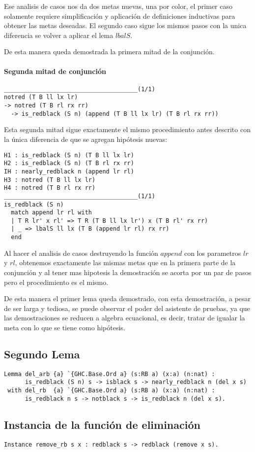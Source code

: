 Ese analisis de casos nos da dos metas nuevas, una por color, el primer caso solamente requiere
simplificaci\'on y aplicaci\'on de definiciones inductivas para obtener las metas deseadas. El
segundo caso sigue los mismos pasos con la unica diferencia se volver a aplicar el lema $lbalS$.

De esta manera queda demostrada la primera mitad de la conjunci\'on.

\paragraph{Segunda mitad de conjunci\'on}

\begin{verbatim}
______________________________________(1/1)
notred (T B ll lx lr)
-> notred (T B rl rx rr)
  -> is_redblack (S n) (append (T B ll lx lr) (T B rl rx rr))
\end{verbatim}

Esta segunda mitad sigue exactamente el mismo procedimiento antes descrito con la \'unica
diferencia de que se agregan hip\'otesis nuevas:

\begin{verbatim}
H1 : is_redblack (S n) (T B ll lx lr)
H2 : is_redblack (S n) (T B rl rx rr)
IH : nearly_redblack n (append lr rl)
H3 : notred (T B ll lx lr)
H4 : notred (T B rl rx rr)
______________________________________(1/1)
is_redblack (S n)
  match append lr rl with
  | T R lr' x rl' => T R (T B ll lx lr') x (T B rl' rx rr)
  | _ => lbalS ll lx (T B (append lr rl) rx rr)
  end
\end{verbatim}

Al hacer el analisis de casos destruyendo la funci\'on $append$ con los parametros $lr$ y $rl$,
obtenemos exactamente las mismas metas que en la primera parte de la conjunci\'on y al tener mas
hipotesis la demostraci\'on se acorta por un par de pasos pero el procedimiento es el mismo.

De esta manera el primer lema queda demostrado, con esta demostraci\'on, a pesar de ser larga y
tediosa, se puede observar el poder del asistente de pruebas, ya que las demostraciones se reducen
a algebra ecuacional, es decir, tratar de igualar la meta con lo que se tiene como hip\'otesis.

\subsection{Segundo Lema}
\begin{verbatim}
Lemma del_arb {a} `{GHC.Base.Ord a} (s:RB a) (x:a) (n:nat) :
      is_redblack (S n) s -> isblack s -> nearly_redblack n (del x s)
 with del_rb  {a} `{GHC.Base.Ord a} (s:RB a) (x:a) (n:nat) :
      is_redblack n s -> notblack s -> is_redblack n (del x s).
\end{verbatim}

\subsection{Instancia de la funci\'on de eliminaci\'on}
\begin{verbatim}
Instance remove_rb s x : redblack s -> redblack (remove x s).
\end{verbatim}
